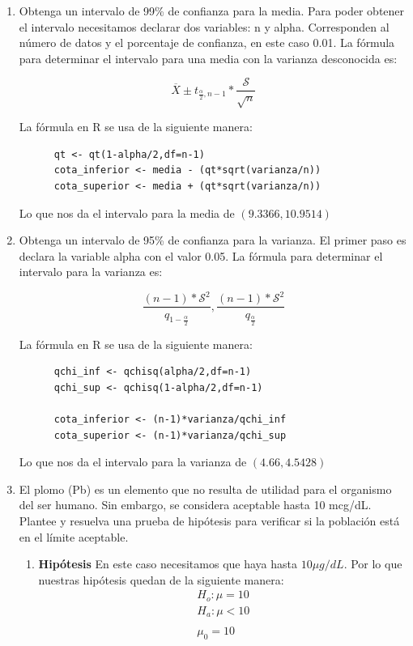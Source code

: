 \documentclass[12pt,a4paper]{article}
\begin{document}
\begin{enumerate}
\begin{enumerate}
    \item Obtenga un intervalo de 99\% de confianza para la media.
    Para poder obtener el intervalo necesitamos declarar dos variables: n y alpha. Corresponden al número de datos y el porcentaje de confianza, en este caso 0.01. La fórmula para determinar el intervalo para una media con la varianza desconocida es:
    
    \[ \overline{X} \pm t_{\frac{\alpha}{2},n-1} * \frac{\mathcal{S}}{\sqrt{n}}  \]
    
    La fórmula en R se usa de la siguiente manera:

    \begin{lstlisting}
      qt <- qt(1-alpha/2,df=n-1)
      cota_inferior <- media - (qt*sqrt(varianza/n))
      cota_superior <- media + (qt*sqrt(varianza/n))
    \end{lstlisting}

    Lo que nos da el intervalo para la media de  \( (9.3366 , 10.9514) \)
    \\

    \item Obtenga un intervalo de 95\% de confianza para la varianza.
    El primer paso es declara la variable alpha con el valor 0.05. La fórmula para determinar el intervalo para la varianza es:
    
    \[ \frac{(n-1)*\mathcal{S}^2}{q_{1-\frac{\alpha}{2}}},\frac{(n-1)*\mathcal{S}^2}{q_{\frac{\alpha}{2}}}  \]
    
    La fórmula en R se usa de la siguiente manera:

    \begin{lstlisting}
      qchi_inf <- qchisq(alpha/2,df=n-1)
      qchi_sup <- qchisq(1-alpha/2,df=n-1)

      cota_inferior <- (n-1)*varianza/qchi_inf
      cota_superior <- (n-1)*varianza/qchi_sup
    \end{lstlisting}

    Lo que nos da el intervalo para la varianza de  \( (4.66 , 4.5428) \)
    \\

    \item El plomo (Pb) es un elemento que no resulta de utilidad para el organismo del ser humano. Sin embargo, se considera aceptable hasta 10 mcg/dL. Plantee y resuelva una prueba de hipótesis para verificar si la población está en el límite aceptable.
    \begin{enumerate}
      \item \textbf{Hipótesis}
      En este caso necesitamos que haya hasta \(10 \mu g/dL\). Por lo que nuestras hipótesis quedan de la siguiente manera:
      \[
        \begin{array}{c}
          H_o : \mu = 10 \\
          H_a : \mu < 10 \\
          \\
          \mu_0 = 10
        \end{array}
      \]


\end{enumerate}
\end{enumerate}
\end{enumerate}
\end{document}

